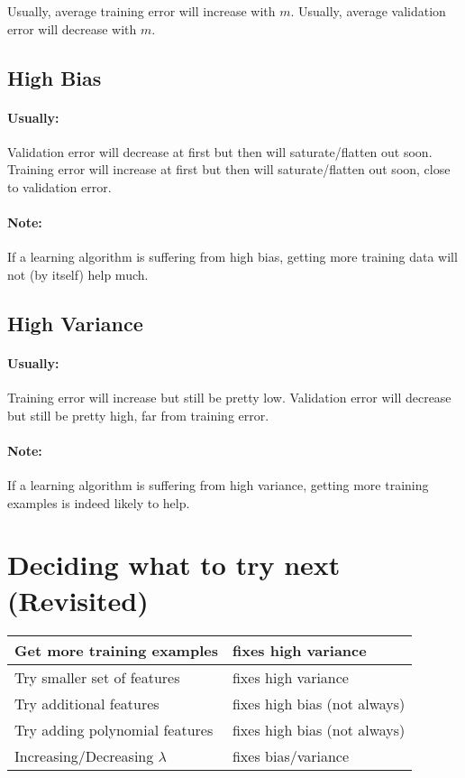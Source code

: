 Usually, average training error will increase with $m$.
Usually, average validation error will decrease with $m$.

\subsection{High Bias}
\paragraph{Usually:}
Validation error will decrease at first but then will saturate/flatten out soon.
Training error will increase at first but then will saturate/flatten out soon, close to
validation error.

\paragraph{Note:} If a learning algorithm is suffering from high bias, getting more training
data will not (by itself) help much.

\subsection{High Variance}
\paragraph{Usually:}
Training error will increase but still be pretty low.
Validation error will decrease but still be pretty high, far from training error.

\paragraph{Note:} If a learning algorithm is suffering from high variance, getting more
training examples is indeed likely to help.

\section{Deciding what to try next (Revisited)}
\begin{tabular}{| l | l |}
	\hline
	Get more training examples      & fixes high variance          \\
	\hline
	Try smaller set of features     & fixes high variance          \\
	\hline
	Try additional features         & fixes high bias (not always) \\
	\hline
	Try adding polynomial features  & fixes high bias (not always) \\
	\hline
	Increasing/Decreasing $\lambda$ & fixes bias/variance          \\
	\hline
\end{tabular}

